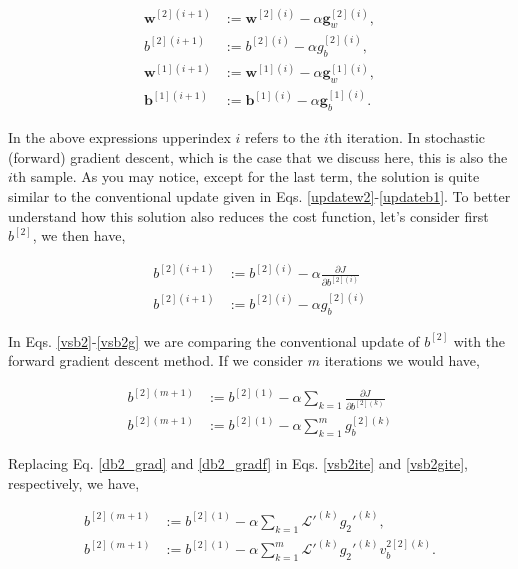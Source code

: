 \documentclass{article}
\begin{document}
\begin{align}
\textbf{w}^{[2](i+1)} &:= \textbf{w}^{[2](i)} - \alpha \textbf{g}_w^{[2](i)}, \\
b^{[2](i+1)} &:= b^{[2](i)} - \alpha g_b^{[2](i)}, \\
\textbf{w}^{[1](i+1)} &:= \textbf{w}^{[1](i)} - \alpha \textbf{g}_w^{[1](i)}, \\
\textbf{b}^{[1](i+1)} &:= \textbf{b}^{[1](i)} - \alpha \textbf{g}_b^{[1](i)}.
\end{align}

In the above expressions upperindex $i$ refers to the $i$th iteration. In stochastic (forward) gradient descent, which is the case that we discuss here, this is also the $i$th sample. As you may notice, except for the last term, the solution is quite similar to the conventional update given in Eqs. \eqref{updatew2}-\eqref{updateb1}. To better understand how this solution also reduces the cost function, let's consider first $b^{[2]}$, we then have,

\begin{align}
\label{vsb2}
b^{[2](i+1)} &:= b^{[2](i)} - \alpha \frac{\partial J}{\partial b^{[2](i)}}\\
b^{[2](i+1)} &:= b^{[2](i)} - \alpha g_b^{[2](i)}
\label{vsb2g}
\end{align}

In Eqs. \eqref{vsb2}-\eqref{vsb2g} we are comparing the conventional update of $b^{[2]}$ with the forward gradient descent method. If we consider $m$ iterations we would have, 


\begin{align}
\label{vsb2ite}
b^{[2](m+1)} &:= b^{[2](1)} - \alpha \sum_{k=1}\frac{\partial J}{\partial b^{[2](k)}}\\
b^{[2](m+1)} &:= b^{[2](1)} - \alpha \sum_{k=1}^m g_b^{[2](k)}
\label{vsb2gite}
\end{align}

Replacing Eq. \eqref{db2_grad} and \eqref{db2_gradf} in Eqs. \eqref{vsb2ite} and \eqref{vsb2gite}, respectively, we have,

\begin{align}
\label{vsb2ites}
b^{[2](m+1)} &:= b^{[2](1)} - \alpha \sum_{k=1}\mathcal{L}'^{(k)}
g_2'^{(k)}, \\
b^{[2](m+1)} &:= b^{[2](1)} - \alpha \sum_{k=1}^m \mathcal{L}'^{(k)}
g_2'^{(k)} v_b^{2[2](k)}.
\label{vsb2gites}
\end{align}
\end{document}
